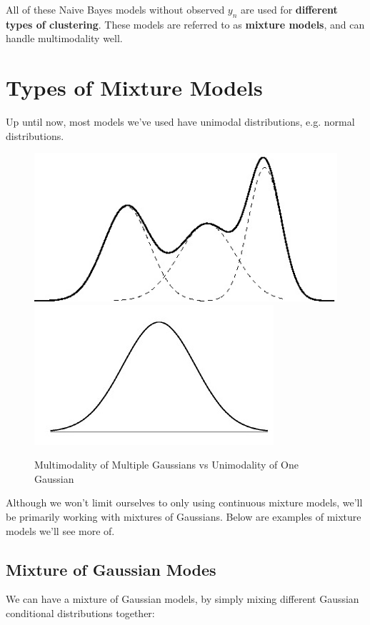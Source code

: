 \documentclass{article}
\begin{document}
All of these Naive Bayes models without observed $y_n$ are used for {\bf different types of clustering}. These models are referred to as {\bf mixture models}, and can handle  multimodality well.  

\section{Types of Mixture Models}
Up until now, most models we've used have unimodal distributions, e.g. normal distributions.

\begin{figure}[H]
  
\includegraphics[scale=0.5]{multimodal.jpg}
\includegraphics[scale=0.5]{gaussian.jpg}
\caption{Multimodality of Multiple Gaussians vs Unimodality of One Gaussian}
\end{figure}   

Although we won't limit ourselves to only using continuous mixture models, we'll be primarily working with mixtures of Gaussians.  Below are examples of mixture models we'll see more of.

\subsection{Mixture of Gaussian Modes}
	We can have a mixture of Gaussian models, by simply mixing different Gaussian conditional distributions together:
\end{document}
